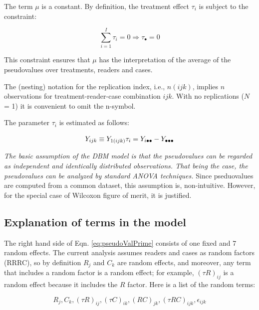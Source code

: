 \documentclass[
]{book}
\begin{document}
The term \(\mu\) is a constant. By definition, the treatment effect \(\tau_i\) is subject to the constraint:

\begin{equation}
\sum_{i=1}^{I}\tau_i=0\Rightarrow \tau_\bullet=0
\label{eq:constraintTau}
\end{equation}

This constraint ensures that \(\mu\) has the interpretation of the average of the pseudovalues over treatments, readers and cases.

The (nesting) notation for the replication index, i.e., \(n(ijk)\), implies \(n\) observations for treatment-reader-case combination \(ijk\). With no replications (\(N\) = 1) it is convenient to omit the n-symbol.

The parameter \(\tau_i\) is estimated as follows:

\begin{equation}
Y_{ijk} \equiv Y_{1(ijk)}\\
\tau_i = Y_{i \bullet \bullet} -Y_{\bullet \bullet \bullet} 
\label{eq:estimatingTau}
\end{equation}

\emph{The basic assumption of the DBM model is that the pseudovalues can be regarded as independent and identically distributed observations. That being the case, the pseudovalues can be analyzed by standard ANOVA techniques.} Since pseduovalues are computed from a common dataset, this assumption is, non-intuitive. However, for the special case of Wilcoxon figure of merit, it is justified.

\hypertarget{explanation-of-terms-in-the-model}{%
\subsection{Explanation of terms in the model}\label{explanation-of-terms-in-the-model}}

The right hand side of Eqn. \eqref{eq:pseudoValPrime} consists of one fixed and 7 random effects. The current analysis assumes readers and cases as random factors (RRRC), so by definition \(R_j\) and \(C_k\) are random effects, and moreover, any term that includes a random factor is a random effect; for example, \((\tau R)_{ij}\) is a random effect because it includes the \(R\) factor. Here is a list of the random terms:

\begin{equation}
R_j, C_k, (\tau R)_{ij}, (\tau C)_{ik}, (RC)_{jk},  (\tau RC)_{ijk},  \epsilon_{ijk}
\label{eq:DBMRandomTerms}
\end{equation}
\end{document}
